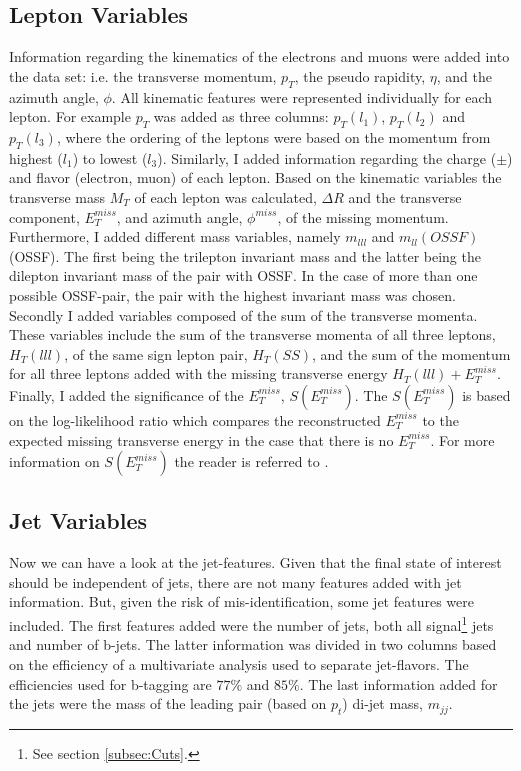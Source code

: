 \subsection{Lepton Variables}\label{subsec:LepSel}
Information regarding the kinematics of the electrons and muons were added into the data set: i.e. the transverse momentum, $p_T$, the pseudo 
rapidity, $\eta$, and the azimuth angle, $\phi$. All kinematic features were represented individually for each lepton. For example $p_T$
was added as three columns: $p_T(l_1)$, $p_T(l_2)$ and $p_T(l_3)$, where the ordering of the leptons were based on the momentum from highest ($l_1$) to lowest ($l_3$).
Similarly, I added information regarding the charge ($\pm$) and flavor (electron, muon) of each lepton. Based on the kinematic variables
the transverse mass $M_T$ of each lepton was calculated, $\Delta R$ and the transverse component, $E_T^{miss}$, and azimuth angle, $\phi^{miss}$,
of the missing momentum.
\\
Furthermore, I added different mass variables, namely $m_{lll}$ and $m_{ll}(OSSF)$ (\ac{OSSF}). The first being the trilepton invariant mass 
and the latter being the dilepton invariant mass of the pair with \ac{OSSF}. In the case of more than one possible \ac{OSSF}-pair,
the pair with the highest invariant mass was chosen. Secondly I added variables composed of the sum of the transverse momenta.
These variables include the sum of the transverse momenta of all three leptons, $H_T(lll)$, of the same sign lepton pair, $H_T(SS)$, and the sum of 
the momentum for all three leptons added with the missing transverse energy $H_T(lll) + E_T^{miss}$. Finally, I added the significance of the
$E_T^{miss}$, $S(E_T^{miss})$. The $S(E_T^{miss})$ is based on the log-likelihood ratio which compares the reconstructed $E_T^{miss}$ to 
the expected missing transverse energy in the case that there is no $E_T^{miss}$. For more information on $S(E_T^{miss})$ the reader is 
referred to \cite{object_based_2018}.
\subsection{Jet Variables}\label{subsec:JetSel}
Now we can have a look at the jet-features. Given that the final state of interest should be independent of jets, there are 
not many features added with jet information. But, given the risk of mis-identification, some jet features were included. The 
first features added were the number of jets, both all signal\footnote{See section \ref{subsec:Cuts}.} jets and number of b-jets.
The latter information was divided in two columns based on the efficiency of a multivariate analysis used to separate jet-flavors.
The efficiencies used for b-tagging are $77\%$ and $85\%$. The last information added for the jets were the mass of the leading pair 
(based on $p_t$) di-jet mass, $m_{jj}$.

